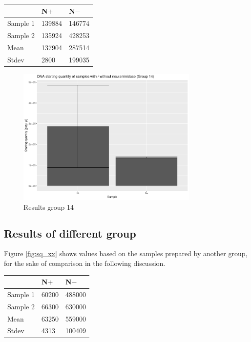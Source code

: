 \documentclass[a4paper,english]{scrreprt}
\begin{document}
\begin{tabu}{lll}
	\toprule
	& N$+$ & N$-$ \\
	\midrule
	Sample 1 & 139884 & 146774 \\
	Sample 2 & 135924 & 428253 \\
	Mean & 137904 & 287514 \\
	Stdev & 2800 & 199035 \\
	\bottomrule
\end{tabu}

\begin{figure}
	\centering
	\includegraphics[width=0.8\textwidth]{img/sq_group14.png}
	\caption{Results group 14}
	\label{fig:sq_14}
\end{figure}

\subsection{Results of different group}

Figure \ref{fig:sq_xx} shows values based on the samples prepared by another
group, for the sake of comparison in the following discussion.
\\

\begin{tabu}{lll}
	\toprule
	& N$+$ & N$-$ \\
	\midrule
	Sample 1 & 60200 & 488000 \\
	Sample 2 & 66300 & 630000 \\
	Mean & 63250 &  559000 \\
	Stdev & 4313 & 100409 \\
	\bottomrule
\end{tabu}
\end{document}
